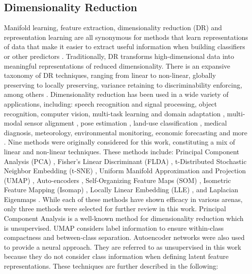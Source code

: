 \documentclass[conference]{IEEEtran}
\begin{document}
	\subsection{Dimensionality Reduction}
	Manifold learning, feature extraction, dimensionality reduction (DR) and representation learning are all synonymous for methods that learn representations of data that make it easier to extract useful information when building classifiers or other predictors \cite{Bengio2014RepLearningReview}. Traditionally, DR transforms high-dimensional data into meaningful representations of reduced dimensionality.  There is an expansive taxonomy of DR techniques, ranging from linear to non-linear, globally preserving to locally preserving, variance retaining to discriminability enforcing, among others \cite{VanDerMaaten2009DRReview}.  Dimensionality reduction has been used in a wide variety  of applications, including: speech recognition and signal processing, object recognition, computer vision, multi-task learning and domain adaptation \cite{Bengio2014RepLearningReview}, multi-modal sensor alignment \cite{zhang2010multisourceremotingsensingfusion,Davenport2010JointManifoldsDataFusion}, pose estimation \cite{Navaratnam2007JointManifoldSemiSupRegression}, land-use classification \cite{Hong2019LearnableManifoldAlignment}, medical diagnosis, meteorology, environmental monitoring, economic forecasting and more \cite{Zitova2003SurveyImageRegistrationMethods}.  Nine methods were originally considered for this work, constituting a mix of linear and non-linear techniques.  These methods include: Principal Component Analysis (PCA) \cite{Tipping1999PPCA,Murphy2012Textbook}, Fisher's Linear Discriminant (FLDA) \cite{Murphy2012Textbook,Sugiyama2006FDASupDimRed}, t-Distributed Stochastic Neighbor Embedding (t-SNE) \cite{vanDerMaaten2008tSNE}, Uniform Manifold Approximation and Projection (UMAP) \cite{McInnes2018UMAP}, Auto-encoders \cite{Haykin2009NeuralNetworks,Goodfellow2016DeepLearning}, Self-Organizing Feature Maps (SOM) \cite{Haykin2009NeuralNetworks,Kohonen1990SOM,Fritzke1995GrowingNeuralGas}, Isometric Feature  Mapping (Isomap) \cite{Tenenbaum2000Isomap,Thorstensen2009ManifoldThesis,VanDerMaaten2009DRReview}, Locally Linear Embedding (LLE) \cite{Roweis2000LLE,Saul2001LLEIntro}, and Laplacian Eigenmaps \cite{Belkin2003LaplacianEigenmaps,VanDerMaaten2009DRReview}.  While each of these methods have shown efficacy in various arenas, only three methods were selected for further review in this work. Principal Component Analysis is a well-known method for dimensionality reduction which is unsupervised. UMAP considers label information to ensure within-class compactness and between-class separation.  Autoencoder networks were also used to provide a neural approach.  They are referred to as unsupervised in this work because they do not consider class information when defining latent feature representations. These techniques are further described in the following:
	
\end{document}
